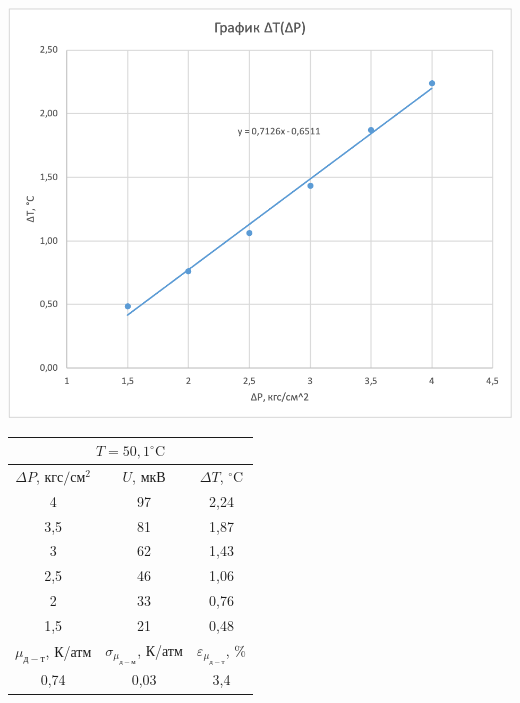 \documentclass[a4paper, 12pt]{article}
\begin{document}
    \begin{table}[pt]
        \captionsetup{justification=centering, margin=2cm}
        
        \begin{minipage}[ht]{0.55\linewidth}
            \includegraphics[width=\linewidth]{images/ch7.png}
        \end{minipage}
        \hfill
        \begin{minipage}[ht]{0.47\linewidth}
            \begin{tabular}{|c|c|c|}
                \hline
                \multicolumn{3}{|c|}{$T = 50,1^{\circ}\text{C}$} \\
                \hline
                $\Delta P$, $кгс/см^2$ & $U$, $мкВ$ & $\Delta T$, $^{\circ}\text{C}$ \\
                \hline
                4 & 97 & 2,24 \\
                \hline
                3,5 & 81 & 1,87 \\
                \hline
                3 & 62 & 1,43 \\
                \hline
                2,5 & 46 & 1,06 \\
                \hline
                2 & 33 & 0,76 \\
                \hline
                1,5 & 21 & 0,48 \\
                \hline
                $\mu_{д-т}$, К/атм & $\sigma_{\mu_{д-м}}$, К/атм & $\varepsilon_{\mu_{д-т}}$, \% \\
                \hline
                0,74 & 0,03 & 3,4 \\
                \hline
            \end{tabular}
        \end{minipage}
        

\end{table}
\end{document}
